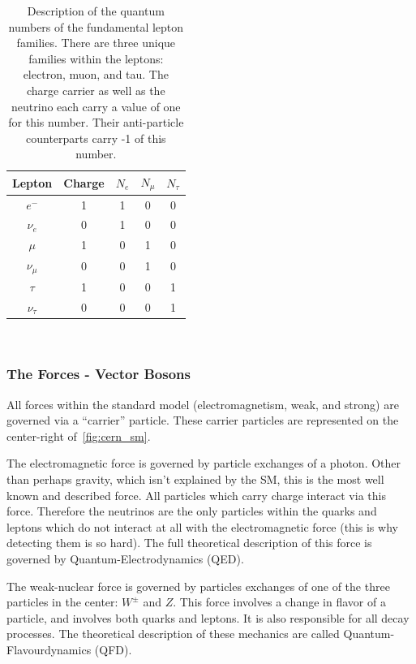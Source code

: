 \begin{table}
\begin{center}
\begin{tabular}{||c c c c c||}
 \hline
 Lepton & Charge & $N_{e}$ & $N_{\mu}$ & $N_{\tau}$ \\ [0.5ex]
 \hline\hline
 $e^{-}$ & 1 & 1 & 0 & 0 \\
 \hline
 $\nu_{e}$ & 0 & 1 & 0 & 0 \\
 \hline
 $\mu$ & 1 & 0 & 1 & 0 \\
 \hline
 $\nu_{\mu}$ & 0 & 0 & 1 & 0 \\
 \hline
 $\tau$ & 1 & 0 & 0 & 1 \\
 \hline
 $\nu_{\tau}$ & 0 & 0 & 0 & 1 \\
 \hline
\end{tabular}
\caption{Description of the quantum numbers of the fundamental lepton families. There are three unique families within the leptons: electron, muon, and tau. The charge carrier as well as the neutrino each carry a value of one for this number. Their anti-particle counterparts carry -1 of this number.}
\end{center}
\end{table}
~\label{table:lepton_qn}

\subsubsection{The Forces - Vector Bosons}

All forces within the standard model (electromagnetism, weak, and strong) are governed via a ``carrier'' particle.
These carrier particles are represented on the center-right of~\ref{fig:cern_sm}.

The electromagnetic force is governed by particle exchanges of a photon.
Other than perhaps gravity, which isn't explained by the SM, this is the most well known and described force.
All particles which carry charge  interact via this force.
Therefore the neutrinos are the only particles within the quarks and leptons which do not interact at all with the electromagnetic force (this is why detecting them is so hard).
The full theoretical description of this force is governed by Quantum-Electrodynamics (QED).

The weak-nuclear force is governed by particles exchanges of one of the three particles in the center: $W^{\pm}$ and $Z$.
This force involves a change in flavor of a particle, and involves both quarks and leptons.
It is also responsible for all decay processes.
The theoretical description of these mechanics are called Quantum-Flavourdynamics (QFD).

